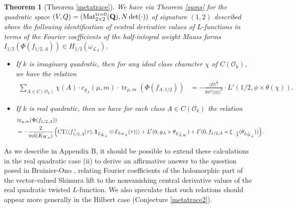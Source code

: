 \documentclass{amsart}
\newtheorem{theorem}{Theorem}[section]
\theoremstyle{definition}
\theoremstyle{definition}
\theoremstyle{definition}
\begin{document}
\begin{theorem}[Theorem \ref{metatrace}]

We have via Theorem \ref{sums} for the quadratic space $(V,Q) = (\operatorname{Mat}_{2 \times 2}^{\operatorname{tr}=0}({\bf{Q}}), N \det(\cdot))$ of signature $(1,2)$ described above the following 
identification of central derivative values of $L$-functions in terms of the Fourier coefficients of the half-integral weight Maass forms $I_{1/2}(\Phi(f_{1/2, A})) \in H_{1/2}(\omega_{\mathcal{L}_A})$.

\begin{itemize}

\item[(i)] If $k$ is imaginary quadratic, then for any ideal class character $\chi$ of $C(\mathcal{O}_k)$, we have the relation 
\begin{align*} \sum\limits_{A \in C(\mathcal{O}_k)} \chi(A) \cdot c_{g_A}(\mu, m) \cdot \operatorname{tr}_{\mu, m} \left( \Phi(f_{A, 1/2}) \right) 
&= - \frac{ \vert D \vert^{\frac{1}{2}}}{ 8 \pi^2 \vert \vert \phi \vert \vert^2  } \cdot L'(1/2, \phi \times \theta(\chi)).  \end{align*}
 
\item[(ii)] If $k$ is real quadratic, then we have for each class $A \in C(\mathcal{O}_k)$ the relation 
\begin{equation*}\begin{aligned} &\operatorname{tr}_{\mu, m}(\Phi(f_{1/2, A})) \\
&= - \frac{2}{\operatorname{vol}(K_{W_A})} 
\left(  \operatorname{CT} \langle \langle f_{1/2, A}^+(\tau), {\bf{1}}_{L_{W_A}^{\perp}} \otimes \mathcal{E}_{L_{W_A}}(\tau) \rangle \rangle
+ L'(0, g_A \times \theta_{L_{A, W}^{\perp}}) + I'(0, f_{1/2, A} \times \xi_{-\frac{1}{2}}(\theta_{L_{W_A}^{\perp}}) )\right).  \end{aligned}\end{equation*}

\end{itemize}

\end{theorem}

As we describe in Appendix B, it should be possible to extend these calculations in the real quadratic case (ii) to derive an affirmative answer to the question posed in 
Bruinier-Ono \cite[Remark 4]{BO}, relating Fourier coefficients of the holomorphic part of the vector-valued Shimura lift to the 
nonvanishing central derivative values of the real quadratic twisted $L$-function. We also speculate that such relations should appear more generally in the Hilbert case (Conjecture \ref{metatrace2}).
\end{document}

